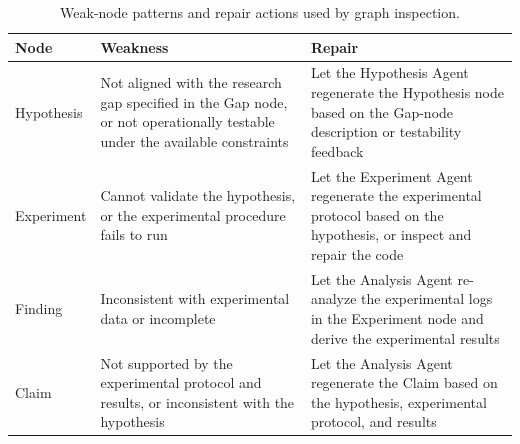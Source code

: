 \documentclass[letterpaper]{article} %
\begin{document}
\begin{table}[t]
  \centering
  \small
  \setlength{\tabcolsep}{4pt}
  \begin{tabular}{@{}p{1.5cm}p{3.0cm}p{3.2cm}@{}}
    \toprule
    \textbf{Node} & \textbf{Weakness} & \textbf{Repair} \\
    \midrule
    Hypothesis & Not aligned with the research gap specified in the Gap node, or not operationally testable under the available constraints & Let the Hypothesis Agent regenerate the Hypothesis node
    based on the Gap-node description or testability feedback \\
    Experiment & Cannot validate the hypothesis, or the experimental procedure fails to run & Let the Experiment Agent regenerate the experimental protocol
    based on the hypothesis, or inspect and repair the code \\
    Finding & Inconsistent with experimental data or incomplete & Let the Analysis Agent re-analyze the experimental logs
    in the Experiment node and derive the experimental results \\
    Claim & Not supported by the experimental protocol and results, or inconsistent with the hypothesis & Let the Analysis Agent regenerate the Claim
    based on the hypothesis, experimental protocol, and results \\
    \bottomrule
  \end{tabular}
  \caption{Weak-node patterns and repair actions used by graph inspection.}
  \label{tab:weak-nodes}
\end{table}
\end{document}
